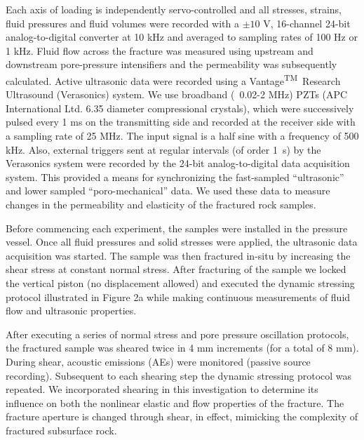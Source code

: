 \documentclass[draft]{agujournal2019}
\begin{document}
Each axis of loading is independently servo-controlled and all stresses, strains, fluid pressures and fluid volumes were recorded with a $\pm10$ V, 16-channel 24-bit analog-to-digital converter at 10 kHz and averaged to sampling rates of 100 Hz or 1 kHz. Fluid flow across the fracture was measured using upstream and downstream pore-pressure intensifiers and the permeability was subsequently calculated. Active ultrasonic data were recorded using a Vantage\textsuperscript{TM}\ Research Ultrasound (Verasonics) system. We use broadband (~0.02-2 MHz) PZTs (APC International Ltd. 6.35 diameter compressional crystals), which were successively pulsed every 1 ms on the transmitting side and recorded at the receiver side with a sampling rate of 25 MHz. The input signal is a half sine with a frequency of 500 kHz. Also, external triggers sent at regular intervals (of order 1~s) by the Verasonics system were recorded by the 24-bit analog-to-digital data acquisition system. This provided a means for synchronizing the fast-sampled “ultrasonic” and lower sampled “poro-mechanical” data. We used these data to measure changes in the permeability and elasticity of the fractured rock samples.

Before commencing each experiment, the samples were installed in the pressure vessel. Once all fluid pressures and solid stresses were applied, the ultrasonic data acquisition was started. The sample was then fractured in-situ by increasing the shear stress at constant normal stress. After fracturing of the sample we locked the vertical piston (no displacement allowed) and executed the dynamic stressing protocol illustrated in Figure 2a while making continuous measurements of fluid flow and ultrasonic properties.

After executing a series of normal stress and pore pressure oscillation protocols, the fractured sample was sheared twice in 4 mm increments (for a total of 8 mm). During shear, acoustic emissions (AEs) were monitored (passive source recording). Subsequent to each shearing step the dynamic stressing protocol was repeated. We incorporated shearing in this investigation to determine its influence on both the nonlinear elastic and flow properties of the fracture. The fracture aperture is changed through shear, in effect, mimicking the complexity of fractured subsurface rock.
\end{document}
